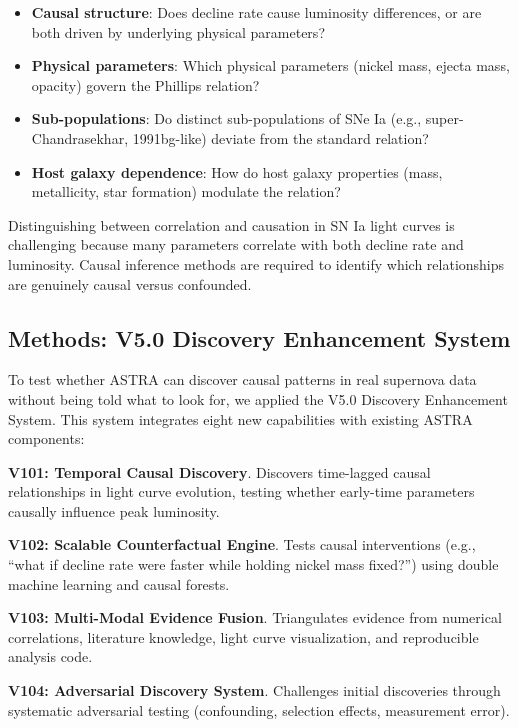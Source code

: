 \documentclass[usenatbib]{rasti}
\begin{document}
\begin{itemize}
\item \textbf{Causal structure}: Does decline rate cause luminosity differences, or are both driven by underlying physical parameters?
\item \textbf{Physical parameters}: Which physical parameters (nickel mass, ejecta mass, opacity) govern the Phillips relation?
\item \textbf{Sub-populations}: Do distinct sub-populations of SNe Ia (e.g., super-Chandrasekhar, 1991bg-like) deviate from the standard relation?
\item \textbf{Host galaxy dependence}: How do host galaxy properties (mass, metallicity, star formation) modulate the relation?
\end{itemize}

Distinguishing between correlation and causation in SN Ia light curves is challenging because many parameters correlate with both decline rate and luminosity. Causal inference methods are required to identify which relationships are genuinely causal versus confounded.

\subsection{Methods: V5.0 Discovery Enhancement System}

To test whether ASTRA can discover causal patterns in real supernova data without being told what to look for, we applied the V5.0 Discovery Enhancement System. This system integrates eight new capabilities with existing ASTRA components:

\noindent\textbf{V101: Temporal Causal Discovery}. Discovers time-lagged causal relationships in light curve evolution, testing whether early-time parameters causally influence peak luminosity.

\noindent\textbf{V102: Scalable Counterfactual Engine}. Tests causal interventions (e.g., ``what if decline rate were faster while holding nickel mass fixed?'') using double machine learning and causal forests.

\noindent\textbf{V103: Multi-Modal Evidence Fusion}. Triangulates evidence from numerical correlations, literature knowledge, light curve visualization, and reproducible analysis code.

\noindent\textbf{V104: Adversarial Discovery System}. Challenges initial discoveries through systematic adversarial testing (confounding, selection effects, measurement error).
\end{document}
